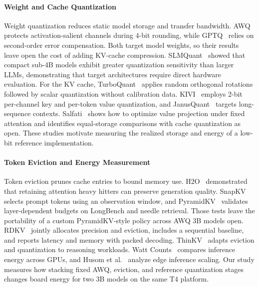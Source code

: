 \documentclass[conference,a4paper]{IEEEtran}
\begin{document}
\paragraph{Weight and Cache Quantization}
Weight quantization reduces static model storage and transfer bandwidth. AWQ~\cite{lin_awq_2025} protects activation-salient channels during 4-bit rounding, while GPTQ~\cite{frantar_gptq_2023} relies on second-order error compensation. Both target model weights, so their results leave open the cost of adding KV-cache compression. SLMQuant~\cite{wang_slmquant_2025} showed that compact sub-4B models exhibit greater quantization sensitivity than larger LLMs, demonstrating that target architectures require direct hardware evaluation. For the KV cache, TurboQuant~\cite{zandieh2026turboquant} applies random orthogonal rotations followed by scalar quantization without calibration data. KIVI~\cite{liu_kivi_2023} employs 2-bit per-channel key and per-token value quantization, and JanusQuant~\cite{sun2026janusquant} targets long-sequence contexts. Salfati~\cite{salfati_quantization_2026} shows how to optimize value projection under fixed attention and identifies equal-storage comparisons with cache quantization as open. These studies motivate measuring the realized storage and energy of a low-bit reference implementation.

\paragraph{Token Eviction and Energy Measurement}
Token eviction prunes cache entries to bound memory use. H2O~\cite{zhang_h2o_2023} demonstrated that retaining attention heavy hitters can preserve generation quality. SnapKV~\cite{li_snapkv_2024} selects prompt tokens using an observation window, and PyramidKV~\cite{cai_pyramidkv_2025} validates layer-dependent budgets on LongBench and needle retrieval. Those tests leave the portability of a custom PyramidKV-style policy across AWQ 3B models open. RDKV~\cite{zhang_rdkv_2026} jointly allocates precision and eviction, includes a sequential baseline, and reports latency and memory with packed decoding. ThinKV~\cite{ramachandran_thinkv_2026} adapts eviction and quantization to reasoning workloads. Watt Counts~\cite{argerich_watt_2026} compares inference energy across GPUs, and Husom et al.~\cite{husom_sustainable_2025} analyze edge inference scaling. Our study measures how stacking fixed AWQ, eviction, and reference quantization stages changes board energy for two 3B models on the same T4 platform.
\end{document}
